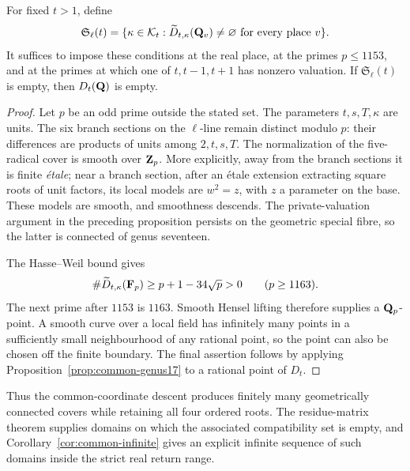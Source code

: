 \begin{proposition}\label{prop:common-finite-places}
For fixed $t>1$, define
\[
 \mathfrak S_\ell(t)=\{\kappa\in\mathcal K_t:
    \widetilde D_{t,\kappa}(\mathbf Q_v)\ne\varnothing
    \text{ for every place }v\}.
\]
It suffices to impose these conditions at the real place, at the primes
$p\le1153$, and at the primes at which one of $t,t-1,t+1$ has nonzero
valuation.  If $\mathfrak S_\ell(t)$ is empty, then $D_t(\mathbf Q)$ is empty.
\end{proposition}
\begin{proof}
Let $p$ be an odd prime outside the stated set.  The parameters
$t,s,T,\kappa$ are units.  The six branch sections on the $\ell$-line
remain distinct modulo $p$: their differences are products of units
among $2,t,s,T$.  The normalization of the five-radical cover is
smooth over $\mathbf Z_p$.  More explicitly, away from the branch sections
it is finite \emph{\'etale}; near a branch section, after an
\'etale extension extracting square roots of unit factors, its local
models are $w^2=z$, with $z$ a parameter on the base.  These models
are smooth, and smoothness descends.  The private-valuation argument
in the preceding proposition persists on the geometric special fibre,
so the latter is connected of genus seventeen.

The Hasse--Weil bound gives
\[
 \#\widetilde D_{t,\kappa}(\mathbf F_p)\ge p+1-34\sqrt p>0
 \qquad(p\ge1163).
\]
The next prime after $1153$ is $1163$.  Smooth Hensel lifting therefore
supplies a $\mathbf Q_p$-point.  A smooth curve over a local field has
infinitely many points in a sufficiently small neighbourhood of any
rational point, so the point can also be chosen off the finite
boundary.  The final assertion follows by applying
Proposition~\ref{prop:common-genus17} to a rational point of $D_t$.
\end{proof}

Thus the common-coordinate descent produces finitely many
geometrically connected covers while retaining all four ordered roots.
The residue-matrix theorem supplies domains on which the associated
compatibility set is empty, and Corollary~\ref{cor:common-infinite}
gives an explicit infinite sequence of such domains inside the strict
real return range.
